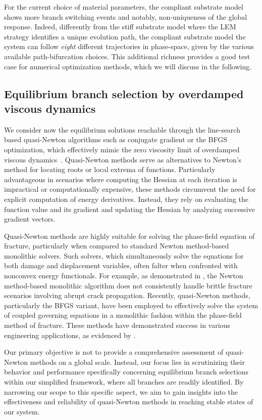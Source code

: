 For the current choice of material parameters, the compliant substrate model shows more branch switching events and {notably,} non-uniqueness of the global response.
Indeed, {differently from} the stiff substrate model {where} the LEM strategy identifies a unique evolution path, the compliant substrate model the system can follow \emph{eight} different trajectories in phase-space, given by the various available path-bifurcation choices.
This additional richness provides a good test case for numerical optimization methods, which we will discuss in the following.

\subsection{Equilibrium branch selection by overdamped viscous dynamics}
We consider now the equilibrium solutions reachable through the line-search based quasi-Newton algorithms such as  conjugate gradient or the BFGS optimization, which effectively  mimic the zero viscosity limit of overdamped viscous dynamics~\cite{SALMAN2012219}. Quasi-Newton methods serve as alternatives to Newton's method for locating roots or local extrema of functions. Particularly advantageous in scenarios where computing the Hessian at each iteration is impractical or computationally expensive, these methods circumvent the need for explicit computation of energy derivatives. Instead, they rely on evaluating the function value and its gradient and updating the Hessian by analyzing successive gradient vectors.

Quasi-Newton methods are highly suitable for solving the phase-field equation of fracture, particularly when compared to standard Newton method-based monolithic solvers. Such solvers, which simultaneously  solve the equations for both damage and displacement variables, often falter when confronted with nonconvex energy functionals. For example, as demonstrated in \cite{Wick2017-bo}, the Newton method-based monolithic algorithm does not consistently handle brittle fracture scenarios involving abrupt crack propagation. Recently, quasi-Newton methods, particularly the BFGS variant, have been employed to effectively solve the system of coupled governing equations in a monolithic fashion within the phase-field method of fracture. These methods have demonstrated success in various engineering applications, as evidenced by \cite{Kristensen2020-zy,Wu2020-qk,Salman2021-mn,Liu2022-ix}.

Our primary objective is not to provide a comprehensive assessment of quasi-Newton methods on a global scale. Instead, our focus lies in scrutinizing their behavior and performance specifically concerning equilibrium branch selections within our simplified framework, where all branches are readily identified. By narrowing our scope to this specific aspect, we aim to gain insights into the effectiveness and reliability of quasi-Newton methods in reaching stable states of our system.

